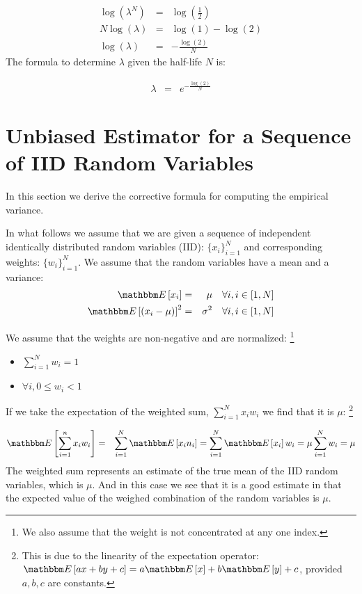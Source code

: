 \documentclass{article}
\newcommand{\E}[1] {\mathbbm E\left[#1\right]}
\begin{document}
\begin{eqnarray*}
    \log(\lambda^N) &=&  \log(\frac{1}{2}) \\
    N \log(\lambda) &=& \log(1) - \log(2)  \\
    \log(\lambda)   &=& -\frac{\log(2)}{N} 
\end{eqnarray*}
The formula to determine $\lambda$ given the half-life $N$ is:

\begin{eqnarray}
    \lambda &=& e^{-\frac{\log(2)}{N}}
\end{eqnarray}

\eject

\appendix

\section{Unbiased Estimator for a Sequence of IID Random Variables}
In this section we derive the corrective formula for computing the empirical variance.

In what follows we assume that we are given a sequence of independent identically distributed random variables (IID):
$\{x_i\}_{i=1}^N$ and corresponding weights: $\{w_i\}_{i=1}^N$.
We assume that the random variables have a mean and a variance:
\begin{eqnarray}
    \E{x_i} &=& \mu  \quad \forall i, i \in [1, N] \\
    \E{(x_i - \mu)}^2 &=& \sigma^2 \quad \forall i, i \in [1, N]  
\end{eqnarray}

We assume that the weights are non-negative and are normalized:%
\footnote{We also assume that the weight is not concentrated at any
one index.}
\begin{itemize}
    \item{$\sum_{i=1}^N w_i = 1$}
    \item{$\forall i, 0 \le w_i < 1$}
\end{itemize}

If we take the expectation of the weighted sum, $\sum_{i=1}^N x_i w_i$ we find that it is $\mu$:%
\footnote{This is due to the linearity of the expectation operator:
$\E{a x + b y + c} = a \E{x} + b \E{y} + c$, provided $a,b,c$ are constants.}

\begin{eqnarray}
    \E{\sum_{i=1}^n x_i w_i} &=& \sum_{i=1}^N \E{x_i n_i} = \sum_{i=1}^N \E{x_i} w_i = \mu \sum_{i=1}^N w_i = \mu 
\end{eqnarray}
The weighted sum represents an estimate of the true mean of the IID random variables, which is $\mu$.
And in this case we see that it is a good estimate in that the expected value of the weighed combination
of the random variables is $\mu$. 
\end{document}
